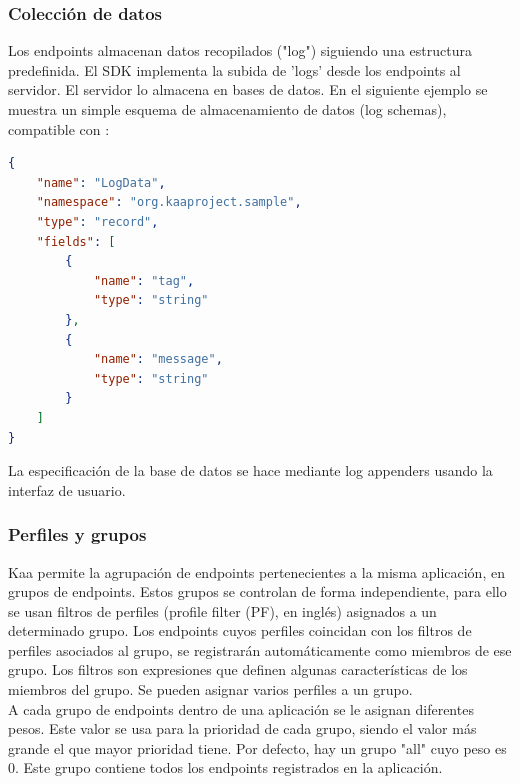 \documentclass[12pt, twoside]{book}
\newcommand{\MYhref}[3][blue]{\href{#2}{\color{#1}{#3}}}
\begin{document}
\subsubsection*{Colección de datos}
Los endpoints almacenan datos recopilados ("log") siguiendo una estructura predefinida. El SDK implementa la subida de 'logs' desde los endpoints al servidor. El servidor lo almacena en bases de datos. En el siguiente ejemplo se muestra un simple esquema de almacenamiento de datos (log schemas), compatible con \MYhref{http://avro.apache.org/docs/current/spec.html}{Avro Schema}:
\begin{lstlisting}[language=json]
{
    "name": "LogData",
    "namespace": "org.kaaproject.sample",
    "type": "record",
    "fields": [
    	{
            "name": "tag",
            "type": "string"
        },
        {
            "name": "message",
            "type": "string"
        }
    ]
}
\end{lstlisting}
La especificación de la base de datos se hace mediante log appenders usando la interfaz de usuario. 
\subsubsection*{Perfiles y grupos}\label{sec:grouping}
Kaa permite la agrupación de endpoints pertenecientes a la misma aplicación, en grupos de endpoints. Estos grupos se controlan de forma independiente, para ello se usan filtros de perfiles (profile filter (PF), en inglés) asignados a un determinado grupo. Los endpoints cuyos perfiles coincidan con los filtros de perfiles asociados al grupo, se registrarán automáticamente como miembros de ese grupo. Los filtros son expresiones que definen algunas características de los miembros del grupo. Se pueden asignar varios perfiles a un grupo.\\
A cada grupo de endpoints dentro de una aplicación se le asignan diferentes pesos. Este valor se usa para la prioridad de cada grupo, siendo el valor más grande el que mayor prioridad tiene. Por defecto, hay un grupo "all" cuyo peso es 0. Este grupo contiene todos los endpoints registrados en la aplicación.  \\
\end{document}
